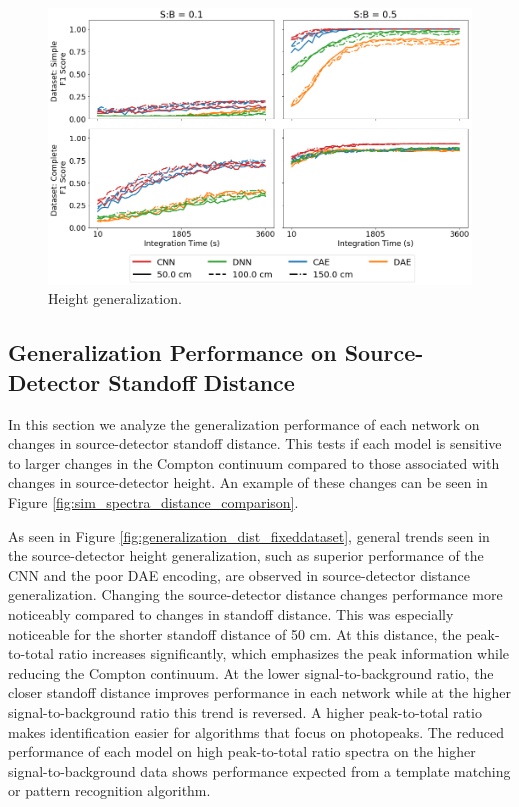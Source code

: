 \begin{figure}[H]
	\centering
	\includegraphics[width=1.0\linewidth]{images/sim-generalization-height}
	\caption{Height generalization.}
	\label{fig:sim-generalization-height}
\end{figure}


\subsection{Generalization Performance on Source-Detector Standoff Distance}

In this section we analyze the generalization performance of each network on changes in source-detector standoff distance. This tests if each model is sensitive to larger changes in the Compton continuum compared to those associated with changes in source-detector height. An example of these changes can be seen in Figure \ref{fig:sim_spectra_distance_comparison}.

As seen in Figure \ref{fig:generalization_dist_fixeddataset}, general trends seen in the source-detector height generalization, such as superior performance of the CNN and the poor DAE encoding, are observed in source-detector distance generalization. Changing the source-detector distance changes performance more noticeably compared to changes in standoff distance. This was especially noticeable for the shorter standoff distance of 50 cm. At this distance, the peak-to-total ratio increases significantly, which emphasizes the peak information while reducing the Compton continuum. At the lower signal-to-background ratio, the closer standoff distance improves performance in each network while at the higher signal-to-background ratio this trend is reversed. A higher peak-to-total ratio makes identification easier for algorithms that focus on photopeaks. The reduced performance of each model on high peak-to-total ratio spectra on the higher signal-to-background data shows performance expected from a template matching or pattern recognition algorithm.



